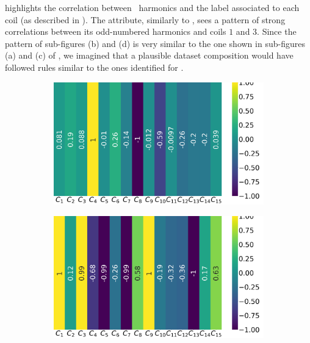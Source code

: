  highlights the correlation between \bn\ harmonics and the label associated
to each coil (as described in ). The attribute, similarly to \an, sees a pattern
of strong correlations between its odd-numbered harmonics and coils $1$ and $3$. Since the pattern
of sub-figures (b) and (d) is very similar to the one shown in sub-figures (a) and (c) of
, we imagined that a plausible dataset composition would have followed rules
similar to the ones identified for \an.
\begin{figure}[!ht]
	\centering
	\begin{subfigure}{0.49\linewidth}
		\includegraphics[width=\linewidth]{img/qlp_corr/Bn_coil0.png}
	\end{subfigure}
	\begin{subfigure}{0.49\linewidth}
		\includegraphics[width=\linewidth]{img/qlp_corr/Bn_coil1.png}
	\end{subfigure}
	\begin{subfigure}{0.49\linewidth}

\end{subfigure}
\end{figure}
